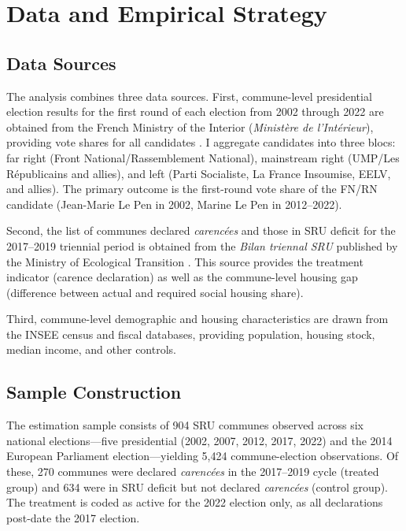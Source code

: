 \documentclass[12pt]{article}
\begin{document}
\section{Data and Empirical Strategy}

\subsection{Data Sources}

The analysis combines three data sources. First, commune-level presidential election results for the first round of each election from 2002 through 2022 are obtained from the French Ministry of the Interior (\textit{Minist\`{e}re de l'Int\'{e}rieur}), providing vote shares for all candidates \citep{interieur2022}. I aggregate candidates into three blocs: far right (Front National/Rassemblement National), mainstream right (UMP/Les R\'{e}publicains and allies), and left (Parti Socialiste, La France Insoumise, EELV, and allies). The primary outcome is the first-round vote share of the FN/RN candidate (Jean-Marie Le Pen in 2002, Marine Le Pen in 2012--2022).

Second, the list of communes declared \textit{caren\-c\'{e}es} and those in SRU deficit for the 2017--2019 triennial period is obtained from the \textit{Bilan triennal SRU} published by the Ministry of Ecological Transition \citep{minist2020}. This source provides the treatment indicator (carence declaration) as well as the commune-level housing gap (difference between actual and required social housing share).

Third, commune-level demographic and housing characteristics are drawn from the INSEE census and fiscal databases, providing population, housing stock, median income, and other controls.

\subsection{Sample Construction}

The estimation sample consists of 904 SRU communes observed across six national elections---five presidential (2002, 2007, 2012, 2017, 2022) and the 2014 European Parliament election---yielding 5,424 commune-election observations. Of these, 270 communes were declared \textit{caren\-c\'{e}es} in the 2017--2019 cycle (treated group) and 634 were in SRU deficit but not declared \textit{caren\-c\'{e}es} (control group). The treatment is coded as active for the 2022 election only, as all declarations post-date the 2017 election.
\end{document}
